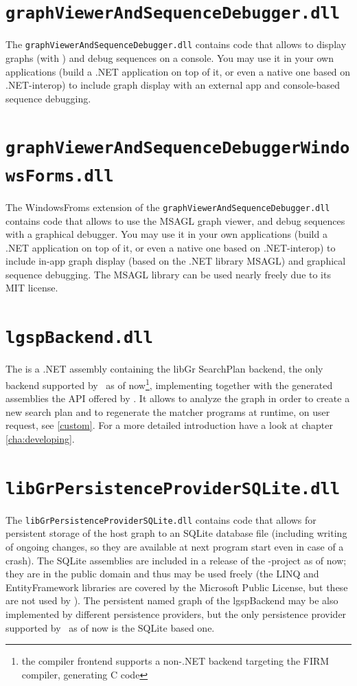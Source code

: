 \section{\texttt{graphViewerAndSequenceDebugger.dll}}
The \texttt{graphViewerAndSequenceDebugger.dll} contains code that allows to display graphs (with \yComp) and debug sequences on a console.
You may use it in your own applications (build a .NET application on top of it, or even a native one based on .NET-interop) to include graph display with an external app and console-based sequence debugging.

\section{\texttt{graphViewerAndSequenceDebuggerWindowsForms.dll}}
The WindowsFroms extension of the \texttt{graphViewerAndSequenceDebugger.dll} contains code that allows to use the MSAGL graph viewer, and debug sequences with a graphical debugger.
You may use it in your own applications (build a .NET application on top of it, or even a native one based on .NET-interop) to include in-app graph display (based on the .NET library MSAGL) and graphical sequence debugging.
The MSAGL library can be used nearly freely due to its MIT license.

\section{\texttt{lgspBackend.dll}}
The \LGSPBackend{} is a .NET assembly containing the libGr SearchPlan backend, the only backend supported by \GrG~as of now\footnote{the compiler frontend supports a non-.NET backend targeting the FIRM compiler, generating C code}, implementing together with the generated assemblies the API offered by \LibGr.
It allows to analyze the graph in order to create a new search plan and to regenerate the matcher programs at runtime, on user request, see \ref{custom}.
For a more detailed introduction have a look at chapter \ref{cha:developing}.

\section{\texttt{libGrPersistenceProviderSQLite.dll}}
The \texttt{libGrPersistenceProviderSQLite.dll} contains code that allows for persistent storage of the host graph to an SQLite database file (including writing of ongoing changes, so they are available at next program start even in case of a crash).
The SQLite assemblies are included in a release of the \GrG-project as of now; they are in the public domain and thus may be used freely (the LINQ and EntityFramework libraries are covered by the Microsoft Public License, but these are not used by \GrG).
The persistent named graph of the lgspBackend may be also implemented by different persistence providers, but the only persistence provider supported by \GrG~as of now is the SQLite based one.

